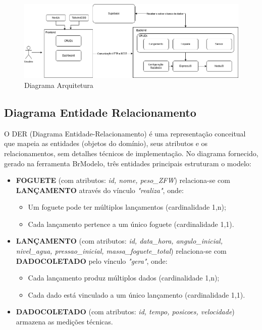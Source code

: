 \begin{figure}[H]
  \centering
  \includegraphics[width=1\linewidth]{editaveis/figuras/diagrama_arquitetura.png}
  \caption{Diagrama Arquitetura}
  \label{fig:enter-label}
\end{figure}



\subsection{Diagrama Entidade Relacionamento}
O DER (Diagrama Entidade-Relacionamento) é uma representação conceitual que mapeia as entidades (objetos do domínio), seus atributos e os relacionamentos, sem detalhes técnicos de implementação. No diagrama fornecido, gerado na ferramenta BrModelo, três entidades principais estruturam o modelo:

\begin{itemize}
  \item \textbf{FOGUETE} (com atributos: \textit{id, nome, peso\_ZFW}) relaciona-se com \textbf{LANÇAMENTO} através do vínculo \textit{"realiza"}, onde:
  \begin{itemize}
    \item Um foguete pode ter múltiplos lançamentos (cardinalidade 1,n);
    \item Cada lançamento pertence a um único foguete (cardinalidade 1,1).
  \end{itemize}

  \item \textbf{LANÇAMENTO} (com atributos: \textit{id, data\_hora, angulo\_inicial, nivel\_agua, pressao\_inicial, massa\_foguete\_total}) relaciona-se com \textbf{DADOCOLETADO} pelo vínculo \textit{"gera"}, onde:
  \begin{itemize}
    \item Cada lançamento produz múltiplos dados (cardinalidade 1,n);
    \item Cada dado está vinculado a um único lançamento (cardinalidade 1,1).
  \end{itemize}

  \item \textbf{DADOCOLETADO} (com atributos: \textit{id, tempo, posicoes, velocidade}) armazena as medições técnicas.
\end{itemize}

